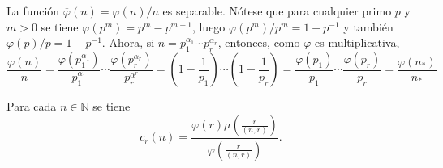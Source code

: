\begin{example}
La función $\overline{\varphi}(n)=\varphi(n)/n$ es separable. Nótese que para cualquier primo $p$ y $m>0$ se tiene $\varphi(p^m)=p^m-p^{m-1}$, luego $\varphi(p^m)/p^m=1-p^{-1}$ y también $\varphi(p)/p=1-p^{-1}$. Ahora, si $n=p_1^{\alpha_1} \cdots p_r^{\alpha_r}$, entonces, como $\varphi$ es multiplicativa,
\begin{equation*}
    \frac{\varphi(n)}{n} = \frac{\varphi(p_1^{\alpha_1})}{p_1^{\alpha_1}} \cdots \frac{\varphi(p_r^{\alpha_r})}{p_r^{\alpha^r}} = \left( 1-\frac{1}{p_1} \right) \cdots \left( 1-\frac{1}{p_r} \right) = \frac{\varphi(p_1)}{p_1} \cdots \frac{\varphi(p_r)}{p_r} = \frac{\varphi(n_*)}{n_*}
\end{equation*}
\end{example}

\begin{lemma}\label{lem:holder}
Para cada $n \in \mathbb{N}$ se tiene
\begin{equation*}
    c_r(n) = \frac{\varphi(r) \mu \left( \displaystyle \frac{r}{(n,r)} \right)}{\varphi \left( \displaystyle \frac{r}{(n,r)} \right)}.
\end{equation*}
\end{lemma}

